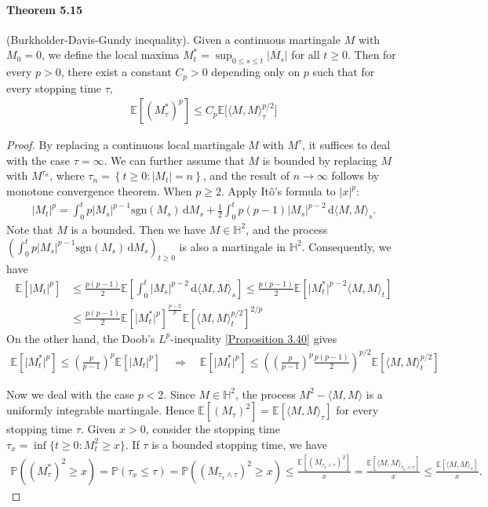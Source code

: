 \documentclass{article}
\numberwithin{equation}{section}
\newcommand{\E}{\mathbb{E}}
\renewcommand{\P}{\mathbb{P}}
\renewcommand{\d}{\mathrm{d}}
\theoremstyle{plain}
\theoremstyle{definition}
\begin{document}
\paragraph{Theorem 5.15\label{thm:5.15}} (Burkholder-Davis-Gundy inequality). Given a continuous martingale $M$ with $M_0=0$, we define the local maxima $M_t^*=\sup_{0\leq s\leq t}\vert M_s\vert$ for all $t\geq 0$.
Then for every $p>0$, there exist a constant $C_p>0$ depending only on $p$ such that for every stopping time $\tau$,
\begin{align*}
	\E\left[(M_\tau^*)^p\right]\leq C_p\E\bigl[\langle M,M\rangle_\tau^{p/2}\bigr]
\end{align*}
\begin{proof}
By replacing a continuous local martingale $M$ with $M^\tau$, it suffices to deal with the case $\tau=\infty$. We can further assume that $M$ is bounded by replacing $M$ with $M^{\tau_n}$, where $\tau_n=\left\{t\geq 0:\vert M_t\vert = n\right\}$, and the result of $n\to\infty$ follows by monotone convergence theorem. When $p\geq 2$. Apply Itô's formula to $\vert x\vert^p$:
\begin{align*}
	\vert M_t\vert^p = \int_0^tp\vert M_s\vert^{p-1}\mathrm{sgn}(M_s)\,\d M_s + \frac{1}{2}\int_0^t p(p-1)\vert M_s\vert^{p-2}\,\d \langle M,M\rangle_s.
\end{align*}
Note that $M$ is a bounded. Then we have $M\in\mathbb{H}^2$, and the process $\left(\int_0^tp\vert M_s\vert^{p-1}\mathrm{sgn}(M_s)\,\d M_s\right)_{t\geq 0}$ is also a martingale in $\mathbb{H}^2$. Consequently, we have
\begin{align*}
	\E\left[\vert M_t\vert^p\right]&\leq\frac{p(p-1)}{2}\E\left[\int_0^t\vert M_s\vert^{p-2}\,\d \langle M,M\rangle_s\right]\leq\frac{p(p-1)}{2}\E\left[\vert M_t^*\vert^{p-2}\langle M,M\rangle_t\right]\\
	&\leq\frac{p(p-1)}{2}\E\left[\vert M_t^*\vert^p\right]^{\frac{p-2}{p}}\E\left[\langle M,M\rangle_t^{p/2}\right]^{2/p}
\end{align*}
On the other hand, the Doob's $L^p$-inequality [\hyperref[prop:3.40]{Proposition 3.40}] gives
\begin{align*}
	\E\left[\vert M_t^*\vert^p\right]\leq\left(\frac{p}{p-1}\right)^p\E\left[\vert M_t\vert^p\right]\quad\Rightarrow\quad \E\left[\vert M_t^*\vert^p\right]\leq\left(\left(\frac{p}{p-1}\right)^p\frac{p(p-1)}{2}\right)^{p/2}\E\left[\langle M,M\rangle_t^{p/2}\right]\tag{5.10}\label{eq:5.10}
\end{align*}

Now we deal with the case $p<2$. Since $M\in\mathbb{H}^2$, the process $M^2-\langle M,M\rangle$ is a uniformly integrable martingale. Hence $\E[(M_\tau)^2]=\E[\langle M,M\rangle_\tau]$ for every stopping time $\tau$. Given $x>0$, consider the stopping time $\tau_x=\inf\{t\geq 0: M_t^2\geq x\}$. If $\tau$ is a bounded stopping time, we have
\begin{align*}
	\P\left((M_\tau^*)^2\geq x\right) = \P(\tau_x\leq\tau) = \P\left((M_{\tau_x\wedge\tau})^2\geq x\right)\leq\frac{\E\left[(M_{\tau_x\wedge\tau})^2\right]}{x}=\frac{\E\left[\langle M,M\rangle_{\tau_x\wedge\tau}\right]}{x}\leq\frac{\E\left[\langle M,M\rangle_\tau\right]}{x}.
\end{align*}


\end{proof}
\end{document}
